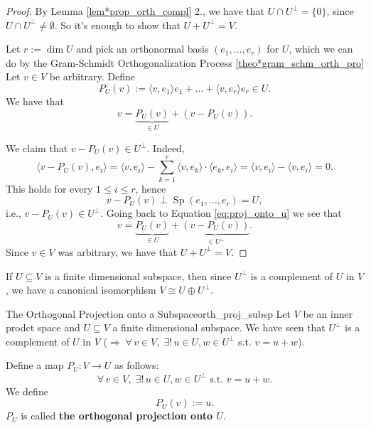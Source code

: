 \begin{proof}
	By Lemma \ref{lem*prop_orth_compl} 2., we have that $U \cap U^{\perp} = \{0\}$, since $U \cap U^{\perp} \neq \emptyset$. So it's enough to show that $U + U^{\perp} = V$.
	
	Let $r := \dim U$ and pick an orthonormal basis $(e_1, \hdots , e_r)$ for $U$, which we can do by the Gram-Schmidt Orthogonalization Process \ref{theo*gram_schm_orth_pro} Let $v \in V$ be arbitrary. Define
	\[
		P_U(v) := \langle v, e_1\rangle e_1 + \hdots + \langle v, e_r \rangle e_r \in U.
	\]
	We have that
	\begin{equation}
		\label{eq:proj_onto_u}
		v = \underbrace{P_U(v)}_{\displaystyle \in U} + (v - P_U(v)).
	\end{equation}
	
	We claim that $v - P_U(v) \in U^{\perp}$. Indeed, 
	\[
		\langle v - P_U(v), e_i \rangle = \langle v, e_i \rangle - \sum_{k=1}^{r} \langle v, e_k \rangle \cdot \langle e_k, e_i \rangle = \langle v, e_i \rangle - \langle v, e_i \rangle = 0.
	\]
	This holds for every $ 1 \leq i \leq r$, hence
	\[
		v - P_U(v) \perp \operatorname{Sp}(e_1, \hdots , e_r) = U,
	\]
	i.e., $v - P_U(v) \in U^{\perp}$. Going back to Equation \eqref{eq:proj_onto_u} we see that
	\[
		v = \underbrace{P_U(v)}_{\displaystyle \in U} + \underbrace{(v - P_U(v))}_{\displaystyle \in U^{\perp}}.
	\]
	Since $v \in V$ was arbitrary, we have that $U + U^{\perp} = V$. \qedhere
\end{proof}

\begin{remark}
	If $U \subseteq V$ is a finite dimensional subspace, then since $U^{\perp}$ is a complement of $U$ in $V$, we have a canonical isomorphism $V \cong U \oplus U^{\perp}$.
\end{remark}

\begin{definition}{The Orthogonal Projection onto a Subspace}{orth_proj_subsp}
	Let $V$ be an inner prodct space and $U \subseteq V$ a finite dimensional subspace. We have seen that $U^{\perp}$ is a complement of $U$ in $V$ ($\Longrightarrow \; \forall \, v\in V, \; \exists ! \,u \in U, w \in U^{\perp} $ s.t. $v = u + w$).
	
	Define a map $P_U : V \to U$ as follows: 
	\[
		\forall \, v \in V, \; \exists ! \, u \in U, w \in U^{\perp} \text{ s.t. } v = u + w.
	\]
	We define
	\[
		P_U(v) := u.
	\]
	$P_U$ is called \textbf{the orthogonal projection onto $U$}.
\end{definition}

